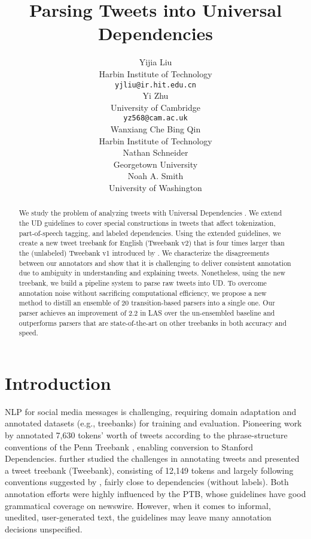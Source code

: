 \documentclass[11pt,a4paper]{article}
\title{Parsing Tweets into Universal Dependencies}
\author{Yijia Liu \\
  Harbin Institute of Technology \\
  {\tt yjliu@ir.hit.edu.cn} \\\And
  Yi Zhu \\
  University of Cambridge \\
  {\tt yz568@cam.ac.uk} \\\AND
  Wanxiang Che \quad Bing Qin\\
  Harbin Institute of Technology\\\And
  Nathan Schneider \\
  Georgetown University \\\And
  Noah A. Smith \\
  University of Washington
  }
\date{}
\begin{document}
\maketitle
\begin{abstract}
We study the problem of analyzing tweets with
Universal Dependencies \citep[UD;][]{NIVRE16.348}. We extend the UD guidelines to cover
special constructions in tweets that affect tokenization,
part-of-speech tagging, and labeled dependencies. Using the extended guidelines, we create
a new tweet treebank for English ({\sc Tweebank v2}) that is four times larger than the (unlabeled) {\sc Tweebank
  v1} introduced by \citet{kong-EtAl:2014:EMNLP2014}. 
We characterize the disagreements between our annotators
and show that it is challenging to deliver
consistent annotation due to ambiguity in
understanding and explaining tweets. Nonetheless, using the new treebank,
we build a pipeline system to parse raw tweets into UD. To overcome 
annotation noise without sacrificing computational efficiency, we propose a new
method to distill an ensemble of 20 transition-based parsers into a single one. Our
parser achieves an improvement of 2.2 in LAS over the un-ensembled baseline 
and outperforms parsers that are state-of-the-art on other treebanks in both accuracy and speed.
\end{abstract}

\section{Introduction}
NLP for social media messages is challenging, requiring domain
adaptation and annotated datasets
(e.g., treebanks)
for training and evaluation.
Pioneering work by \citet{Foster:2011:HPT:2908630.2908634} 
annotated 7,630 tokens' worth of tweets according to the
phrase-structure conventions of the Penn Treebank
\citep[PTB;][]{Marcus93buildinga}, enabling conversion to Stanford Dependencies.
\citet{kong-EtAl:2014:EMNLP2014} further studied the challenges in
annotating tweets and presented a tweet treebank ({\sc Tweebank}),
consisting of 12,149 tokens and largely following conventions
suggested by \citet{schneider-EtAl:2013:LAW7-ID}, fairly close to 
\citet{Yamada03statisticaldependency} dependencies (without labels). 
Both annotation efforts were highly influenced by the PTB, whose guidelines
have good grammatical coverage on newswire. However, when it comes
to informal, unedited, user-generated text, the guidelines may leave
many annotation decisions unspecified.
\end{document}
